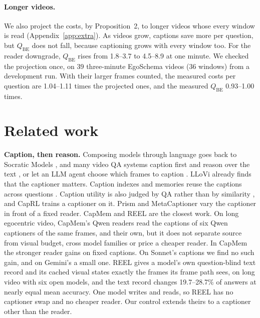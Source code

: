 \documentclass[11pt]{article}
\newcommand{\qbe}{\ensuremath{Q_{\mathrm{BE}}}}
\begin{document}
\paragraph{Longer videos.} We also project the costs, by Proposition~2, to longer videos whose every window is read (Appendix~\ref{app:extra}). As videos grow, captions save more per question, but \qbe{} does not fall, because captioning grows with every window too. For the reader downgrade, \qbe{} rises from 1.8--3.7 to 4.5--8.9 at one minute. We checked the projection once, on 39 three-minute EgoSchema videos (36 windows) from a development run. With their larger frames counted, the measured costs per question are 1.04--1.11 times the projected ones, and the measured \qbe{} 0.93--1.00 times.

\section{Related work}
\label{sec:related}
\textbf{Caption, then reason.} Composing models through language goes back to Socratic Models \citep{socratic}, and many video QA systems caption first and reason over the text \citep{llovi,videotree,silvr,vamos}, or let an LLM agent choose which frames to caption \citep{videoagent}. LLoVi already finds that the captioner matters. Caption indexes and memories reuse the captions across questions \citep{cfd,capmem,sprout,vidctx}. Caption utility is also judged by QA rather than by similarity \citep{captionqa,capquiz,visil}, and CapRL \citep{caprl} trains a captioner on it. Prism \citep{prism} and MetaCaptioner \citep{metacaptioner} vary the captioner in front of a fixed reader. CapMem \citep{capmem} and REEL \citep{reel} are the closest work. On long egocentric video, CapMem's Qwen readers read the captions of six Qwen captioners of the same frames, and their own, but it does not separate source from visual budget, cross model families or price a cheaper reader. In CapMem the stronger reader gains on fixed captions. On Sonnet's captions we find no such gain, and on Gemini's a small one. REEL gives a model's own question-blind text record and its cached visual states exactly the frames its frame path sees, on long video with six open models, and the text record changes 19.7--28.7\% of answers at nearly equal mean accuracy. One model writes and reads, so REEL has no captioner swap and no cheaper reader. Our control extends theirs to a captioner other than the reader.
\end{document}
